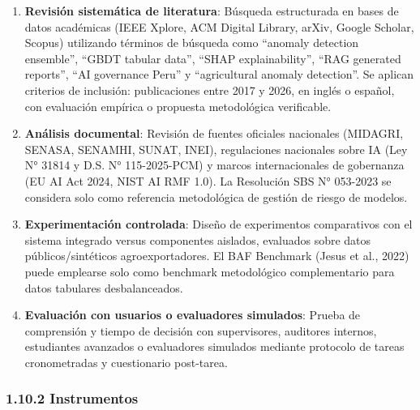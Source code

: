 \begin{enumerate}
\def\labelenumi{\arabic{enumi}.}
\item
  \textbf{Revisión sistemática de literatura}: Búsqueda estructurada en
  bases de datos académicas (IEEE Xplore, ACM Digital Library, arXiv,
  Google Scholar, Scopus) utilizando términos de búsqueda como ``anomaly
  detection ensemble'', ``GBDT tabular data'', ``SHAP explainability'',
  ``RAG generated reports'', ``AI governance Peru'' y ``agricultural
  anomaly detection''. Se aplican criterios de inclusión: publicaciones
  entre 2017 y 2026, en inglés o español, con evaluación empírica o
  propuesta metodológica verificable.
\item
  \textbf{Análisis documental}: Revisión de fuentes oficiales nacionales
  (MIDAGRI, SENASA, SENAMHI, SUNAT, INEI), regulaciones nacionales sobre
  IA (Ley N° 31814 y D.S. N° 115-2025-PCM) y marcos internacionales de
  gobernanza (EU AI Act 2024, NIST AI RMF 1.0). La Resolución SBS N°
  053-2023 se considera solo como referencia metodológica de gestión de
  riesgo de modelos.
\item
  \textbf{Experimentación controlada}: Diseño de experimentos
  comparativos con el sistema integrado versus componentes aislados,
  evaluados sobre datos públicos/sintéticos agroexportadores. El BAF
  Benchmark (Jesus et al., 2022) puede emplearse solo como benchmark
  metodológico complementario para datos tabulares desbalanceados.
\item
  \textbf{Evaluación con usuarios o evaluadores simulados}: Prueba de
  comprensión y tiempo de decisión con supervisores, auditores internos,
  estudiantes avanzados o evaluadores simulados mediante protocolo de
  tareas cronometradas y cuestionario post-tarea.
\end{enumerate}

\subsubsection{1.10.2 Instrumentos}\label{instrumentos}

